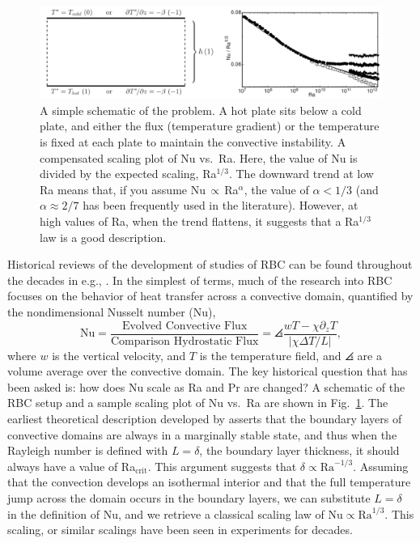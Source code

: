 \begin{figure}[t!]
\includegraphics[width=\textwidth]{./figs/intro/rayleigh_benard_description.pdf}
\caption[A description of \RB convection studies.]
{
	\citep[left, Fig.~1 of][]{johnston&doering2009} A simple schematic of the \RB problem.
	A hot plate sits below a cold plate, and either the flux (temperature gradient) or the temperature is fixed at each plate to maintain the convective instability.
	\citep[right, Fig.~4 of][]{ahlers&all2009} A compensated scaling plot of Nu vs.~Ra.
	Here, the value of Nu is divided by the expected scaling, Ra$^{1/3}$.
	The downward trend at low Ra means that, if you assume Nu$\,\propto\,$Ra$^{\alpha}$, the value of $\alpha < 1/3$ (and $\alpha \approx 2/7$ has been frequently used in the literature).
	However, at high values of Ra, when the trend flattens, it suggests that a Ra$^{1/3}$ law is a good description.
	\label{fig:rayleigh_benard_description} 
}
\end{figure}

Historical reviews of the development of studies of RBC can be found throughout the decades in e.g., \citet{busse1978, siggia1994, ahlers&all2009}.
In the simplest of terms, much of the research into RBC focuses on the behavior of heat transfer across a convective domain, quantified by the nondimensional Nusselt number (Nu),
\begin{equation}
\text{Nu} = \frac{\text{Evolved Convective Flux}}{\text{Comparison Hydrostatic Flux}} = \angles{\frac{w T - \chi \partial_z T}{|\chi \Delta T / L|}},
\end{equation}
where $w$ is the vertical velocity, and $T$ is the temperature field, and $\angles{}$ are a volume average over the convective domain.
The key historical question that has been asked is: how does Nu scale as Ra and Pr are changed?
A schematic of the RBC setup and a sample scaling plot of Nu vs.~Ra are shown in Fig.~\ref{fig:rayleigh_benard_description}.
The earliest theoretical description developed by \citet{malkus1954} asserts that the boundary layers of convective domains are always in a marginally stable state, and thus when the Rayleigh number is defined with $L = \delta$, the boundary layer thickness, it should always have a value of Ra$_{\text{crit}}$.
This argument suggests that $\delta \propto \text{Ra}^{-1/3}$.
Assuming that the convection develops an isothermal interior and that the full temperature jump across the domain occurs in the boundary layers, we can substitute $L = \delta$ in the definition of Nu, and we retrieve a classical scaling law of $\text{Nu} \propto \text{Ra}^{1/3}$.
This scaling, or similar scalings have been seen in experiments for decades.



